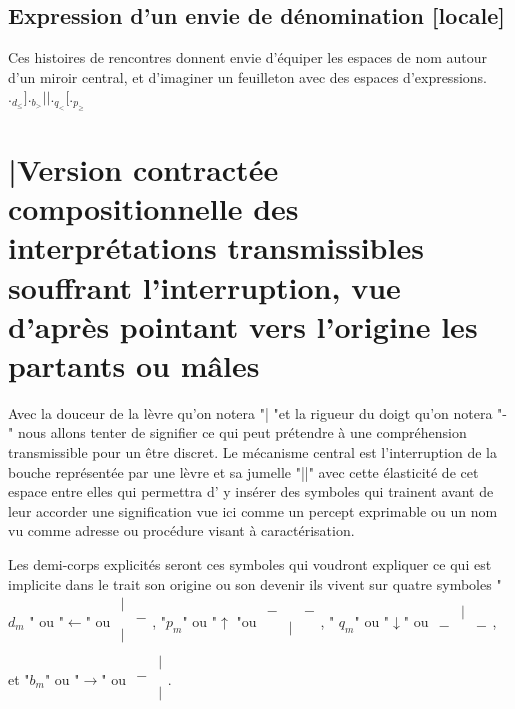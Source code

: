 \documentclass{article}
\newcommand{\bmat}{\scriptscriptstyle\begin{matrix}
& |  \\
 - &  \\
  & |  \\
\end{matrix}}
\begin{document}
 
\subsection{Expression d'un envie de dénomination [locale]}
Ces histoires de rencontres  donnent envie d'équiper les espaces de nom autour  d'un miroir central, et d'imaginer un feuilleton avec des espaces d'expressions.
 $._{d_\le}]._{b_>}||._{q_<}[._{p_\ge}$
  
\section{|Version contractée compositionnelle des interprétations transmissibles souffrant l'interruption, vue d'après pointant vers l'origine les partants ou mâles}
Avec la douceur de la lèvre qu'on notera "| "et la rigueur du doigt qu'on notera "-" nous allons tenter de signifier ce qui peut prétendre à une compréhension transmissible pour un être discret.
Le mécanisme central est l'interruption de la bouche représentée par une lèvre et sa jumelle "||" avec cette élasticité de cet espace entre elles qui permettra d' y  insérer des symboles qui trainent avant de leur accorder une signification vue ici comme un percept exprimable ou un nom vu comme adresse ou procédure visant à caractérisation.

Les demi-corps explicités  seront ces symboles qui voudront expliquer ce qui est implicite dans le trait son origine ou son devenir ils vivent sur quatre  symboles "$d_m$ " ou "$\leftarrow$" ou 
${\scriptscriptstyle\begin{matrix}
|&   \\
  & - \\
 | &   \\
\end{matrix}}$, 
"$p_m$" ou "$\uparrow$ "ou ${\scriptscriptstyle\begin{matrix}
&  & \\
 - &&  -\\
  &|&  \\
\end{matrix}}$,
" $q_m$" ou "$\downarrow$" ou  ${\scriptscriptstyle\begin{matrix}
& |&  \\
  -&&-  \\
  &&   \\
\end{matrix}}$, et "$b_m$" ou "$\rightarrow$" ou $\bmat$.

%
\end{document}
